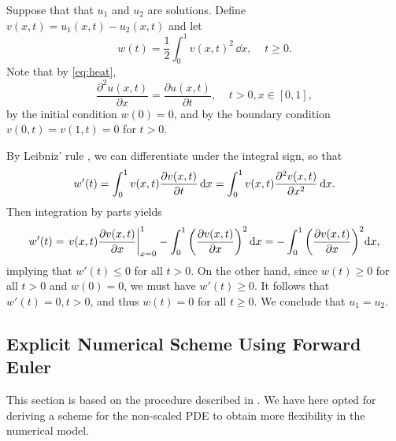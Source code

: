Suppose that that $u_1$ and $u_2$ are solutions. Define $v(x,t)=u_1(x,t)-u_2(x,t)$ and let
\begin{equation*}
    w(t)=\frac{1}{2}\int_0^1v(x,t)^2\,\dd x,\;\;\;\; t\ge0.
\end{equation*}
Note that by \cref{eq:heat},
\begin{equation*}
    \frac{\partial^2 u(x,t)}{\partial x}= \frac{\partial u(x,t)}{\partial t},\;\;\;\;t>0,x\in[0,1],
\end{equation*}
by the initial condition $w(0)=0$, and by the boundary condition $v(0,t)=v(1,t)=0$ for $t>0$.

By Leibniz' rule \cite[.2]{die69}, we can differentiate under the integral sign, so that
\begin{equation*}
    w'(t) = \int_0^1v(x,t)\pdv{v(x,t)}{t}\,\dd x = \int_0^1 v(x,t)\pdv[2]{v(x,t)}{x}\,\dd x.
\end{equation*}
Then integration by parts yields
\begin{equation*}
    w'(t) = \eval{v(x,t)\pdv{v(x,t)}{x}}_{x=0}^1 - \int_0^1\qty(\pdv{v(x,t)}{x})^2\,\dd x = -\int_0^1\qty(\pdv{v(x,t)}{x})^2\dd x,
\end{equation*}
implying that $w'(t)\le 0$ for all $t>0$. On the other hand, since $w(t)\ge0$ for all $t>0$ and $w(0)=0$, we must have $w'(t)\ge0$. It follows that $w'(t)=0, t>0$, and thus $w(t)=0$ for all $t\ge0$. We conclude that $u_1=u_2$.


\subsection{Explicit Numerical Scheme Using Forward Euler}\label{sec:Heat numerical Theory}
This section is based on the procedure described in \cite{hpl}. We have here opted for deriving a scheme for the non-scaled PDE to obtain more flexibility in the numerical model.

